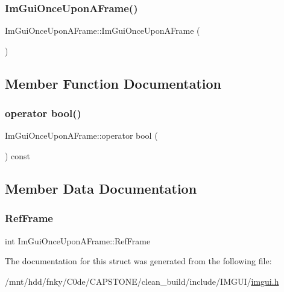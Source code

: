 \subsubsection{\texorpdfstring{Im\+Gui\+Once\+Upon\+A\+Frame()}{ImGuiOnceUponAFrame()}}
{\footnotesize\ttfamily Im\+Gui\+Once\+Upon\+A\+Frame\+::\+Im\+Gui\+Once\+Upon\+A\+Frame (\begin{DoxyParamCaption}{ }\end{DoxyParamCaption})\hspace{0.3cm}{\ttfamily [inline]}}



\subsection{Member Function Documentation}
\mbox{\label{structImGuiOnceUponAFrame_a3c912b79bc333ce746356001431c2504}} 
\subsubsection{\texorpdfstring{operator bool()}{operator bool()}}
{\footnotesize\ttfamily Im\+Gui\+Once\+Upon\+A\+Frame\+::operator bool (\begin{DoxyParamCaption}{ }\end{DoxyParamCaption}) const\hspace{0.3cm}{\ttfamily [inline]}}



\subsection{Member Data Documentation}
\mbox{\label{structImGuiOnceUponAFrame_a2d44776b8e7bdeec217f88be9f832e08}} 
\subsubsection{\texorpdfstring{Ref\+Frame}{RefFrame}}
{\footnotesize\ttfamily int Im\+Gui\+Once\+Upon\+A\+Frame\+::\+Ref\+Frame\hspace{0.3cm}{\ttfamily [mutable]}}



The documentation for this struct was generated from the following file\+:\begin{DoxyCompactItemize}
\item 
/mnt/hdd/fnky/\+C0de/\+C\+A\+P\+S\+T\+O\+N\+E/clean\+\_\+build/include/\+I\+M\+G\+U\+I/\hyperlink{imgui_8h}{imgui.\+h}\end{DoxyCompactItemize}
